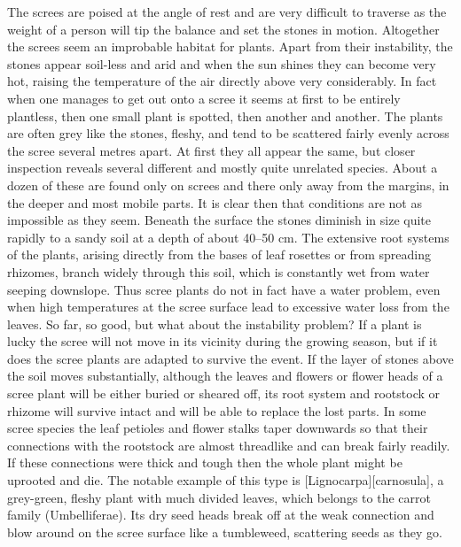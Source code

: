 The screes are poised at the angle of rest and are very difficult to traverse as the weight of a person will tip the balance and set the stones in motion.
Altogether the screes seem an improbable habitat for plants.
Apart from their instability, the stones appear soil-less and arid and when the sun shines they can become very hot, raising the temperature of the air directly above very considerably.
In fact when one manages to get out onto a scree it seems at first to be entirely plantless, then one small plant is spotted, then another and another.
The plants are often grey like the stones, fleshy, and tend to be scattered fairly evenly across the scree several metres apart.
At first they all appear the same, but closer inspection reveals several different and mostly quite unrelated species.
About a dozen of these are found only on screes and there only away from the margins, in the deeper and most mobile parts.
It is clear then that conditions are not as impossible as they seem.
Beneath the surface the stones diminish in size quite rapidly to a sandy soil at a depth of about 40--50 cm.
The extensive root systems of the plants, arising directly from the bases of leaf rosettes or from spreading rhizomes, branch widely through this soil, which is constantly wet from water seeping downslope.
Thus scree plants do not in fact have a water problem, even when high temperatures at the scree surface lead to excessive water loss from the leaves.
So far, so good, but what about the instability problem? If a plant is lucky the scree will not move in its vicinity during the growing season, but if it does the scree plants are adapted to survive the event.
If the layer of stones above the soil moves substantially, although the leaves and flowers or flower heads of a scree plant will be either buried or sheared off, its root system and rootstock or rhizome will survive intact and will be able to replace the lost parts.
In some scree species the leaf petioles and flower stalks taper downwards so that their connections with the rootstock are almost threadlike and can break fairly readily.
If these connections were thick and tough then the whole plant might be uprooted and die.
The notable example of this type is [Lignocarpa][carnosula], a grey-green, fleshy plant with much divided leaves, which belongs to the carrot family (Umbelliferae).
Its dry seed heads break off at the weak connection and blow around on the scree surface like a tumbleweed, scattering seeds as they go.


